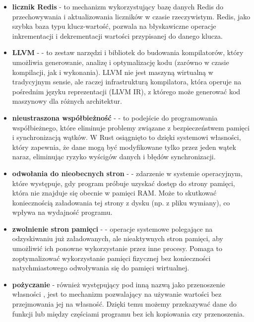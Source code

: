 \begin{itemize}
    \item \textbf{licznik Redis} - to mechanizm wykorzystujący bazę danych Redis do przechowywania i aktualizowania liczników w czasie rzeczywistym. Redis, jako szybka baza typu klucz-wartość, pozwala na błyskawiczne operacje inkrementacji i dekrementacji wartości przypisanej do danego klucza.

    \item \textbf{LLVM} -  - to zestaw narzędzi i bibliotek do budowania kompilatorów, który umożliwia generowanie, analizę i optymalizację kodu (zarówno w czasie kompilacji, jak i wykonania). LLVM nie jest maszyną wirtualną w tradycyjnym sensie, ale raczej infrastrukturą kompilatora, która operuje na pośrednim języku reprezentacji (LLVM IR), z którego może generować kod maszynowy dla różnych architektur.

    \item \textbf{nieustraszona współbieżność} -  - to podejście do programowania współbieżnego, które eliminuje problemy związane z bezpieczeństwem pamięci i synchronizacją wątków. W Rust osiągnięto to dzięki systemowi własności, który zapewnia, że dane mogą być modyfikowane tylko przez jeden wątek naraz, eliminując ryzyko wyścigów danych i błędów synchronizacji.

    \item \textbf{odwołania do nieobecnych stron} -  - zdarzenie w systemie operacyjnym, które występuje, gdy program próbuje uzyskać dostęp do strony pamięci, która nie znajduje się obecnie w pamięci RAM. Może to skutkować koniecznością załadowania tej strony z dysku (np. z pliku wymiany), co wpływa na wydajność programu.

    \item \textbf{zwolnienie stron pamięci} -  - operacje systemowe polegające na odzyskiwaniu już załadowanych, ale nieaktywnych stron pamięci, aby umożliwić ich ponowne wykorzystanie przez inne procesy. Pomaga to zoptymalizować wykorzystanie pamięci fizycznej bez konieczności natychmiastowego odwoływania się do pamięci wirtualnej.

    \item \textbf{pożyczanie}  - również występujący pod inną nazwą jako przenoszenie własności \cite{rustPolishNames}, jest to mechanizm pozwalający na używanie wartości bez przejmowania jej na własność. Dzięki temu możemy przekazywać dane do funkcji lub między częściami programu bez ich kopiowania czy przenoszenia.


\end{itemize}
